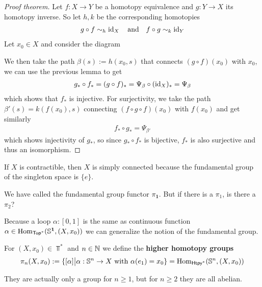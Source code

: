 \begin{proof}[Proof theorem]
Let $f: X \to Y$ be a homotopy equivalence and $g: Y \to  X$ its homotopy inverse. So let $h,k$ be the corresponding homotopies
\begin{align*}
  g \circ f \sim_h \operatorname{id}_X \quad \text{and} \quad f \circ g \sim_k \operatorname{id}_Y
\end{align*}
Let $x_0 \in X$ and consider the diagram
\begin{center}
\end{center}
We then take the path $\beta(s) := h(x_0,s)$ that connects $(g \circ f)(x_0)$ with $x_0$, we can use the previous lemma to get
\begin{align*}
  g_{\ast} \circ f_{\ast} = (g \circ f)_{\ast} = \Psi_{\beta} \circ (\operatorname{id}_X)_{\ast} = \Psi_{\beta}
\end{align*}
which shows that $f_{\ast}$ is injective.
For surjectivity, we take the path $\beta'(s) = k(f(x_0),s)$ connecting $(f \circ g \circ f)(x_0)$ with $f(x_0)$ and get similarly
\begin{align*}
 f_{\ast}\circ g_{\ast} = \Psi_{\beta'} 
\end{align*}
which shows injectivity of $g_{\ast}$, so since $g_{\ast} \circ f_{\ast}$ is bijective, $f_{\ast}$ is also surjective and thus an isomorphism.
\end{proof}



\begin{ex}[]
If $X$ is contractible, then $X$ is simply connected because the fundamental group of the singleton space is $\{e\}$.
\end{ex}

We have called the fundamental group functor $\pi_{\bm{1}}$. But if there is a $\pi_1$, is there a $\pi_2$?

Because a loop $\alpha: [0,1]$ is the same as continuous function $\alpha \in \operatorname{Hom}_{\text{\sffamily Top}^{\ast}}(\mathbb{S}^{\bm{1}},(X,x_0))$ we can generalize the notion of the fundamental group.

\begin{dfn}[]
  For $(X,x_0) \in \Top^{\ast}$ and $n \in \mathbb{N}$ we define the \textbf{higher homotopy groups}
  \begin{align*}
    \pi_n(X,x_0) := \{[\alpha] \big\vert \alpha: \mathbb{S}^{n} \to  X \text{ with } \alpha(e_1) = x_0\} = \operatorname{Hom}_{\text{\sffamily Htpy}^{\ast}}(\mathbb{S}^{n},(X,x_0))
  \end{align*}
\end{dfn}
They are actually only a group for $n \geq 1$, but for $n \geq 2$ they are all abelian.

